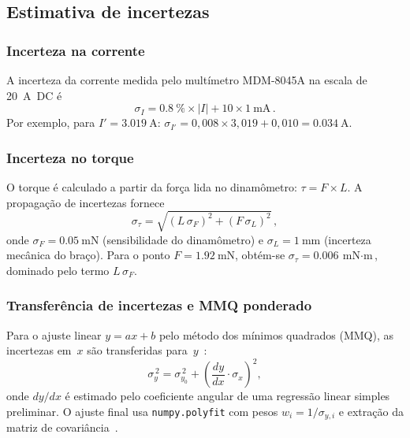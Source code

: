\documentclass[aps, twocolumn, superscriptaddress, floatfix, nofootinbib]{revtex4-2}
\begin{document}
\subsection{Estimativa de incertezas}\label{sec:incertezas}

\subsubsection{Incerteza na corrente}

A incerteza da corrente medida pelo multímetro MDM-8045A na escala de
\SI{20}{\ampere}~DC é~\cite{MDM8045A}
\begin{equation}\label{eq:sigI}
  \sigma_{I} = \SI{0,8}{\percent}\times|I| + 10\times\SI{1}{\milli\ampere}\,.
\end{equation}
Por exemplo, para $I'=\SI{3,019}{\ampere}$: $\sigma_{I'}=
0{,}008\times 3{,}019 + 0{,}010 = \SI{0,034}{\ampere}$.

\subsubsection{Incerteza no torque}

O torque é calculado a partir da força lida no dinamômetro:
$\tau = F\times L$. A propagação de incertezas fornece
\begin{equation}\label{eq:sigtau}
  \sigma_\tau = \sqrt{(L\,\sigma_F)^2 + (F\,\sigma_L)^2}\,,
\end{equation}
onde $\sigma_F = \SI{0,05}{\milli\newton}$ (sensibilidade do dinamômetro) e
$\sigma_L = \SI{1}{\milli\metre}$ (incerteza mecânica do braço). Para o ponto
$F=\SI{1,92}{\milli\newton}$, obtém-se $\sigma_\tau = \SI{0,006}{\milli\newton
\cdot\metre}$, dominado pelo termo $L\,\sigma_F$.

\subsubsection{Transferência de incertezas e MMQ ponderado}

Para o ajuste linear $y=ax+b$ pelo método dos mínimos quadrados (MMQ), as
incertezas em~$x$ são transferidas para~$y$~\cite{Vuolo}:
\begin{equation}\label{eq:transf}
  \sigma_y^{\,2} = \sigma_{y_0}^{\,2}
    + \left(\frac{dy}{dx}\cdot\sigma_x\right)^2,
\end{equation}
onde $dy/dx$ é estimado pelo coeficiente angular de uma regressão linear
simples preliminar. O ajuste final usa \texttt{numpy.polyfit} com pesos
$w_i=1/\sigma_{y,i}$ e extração da matriz de covariância~\cite{Vuolo}.
\end{document}
